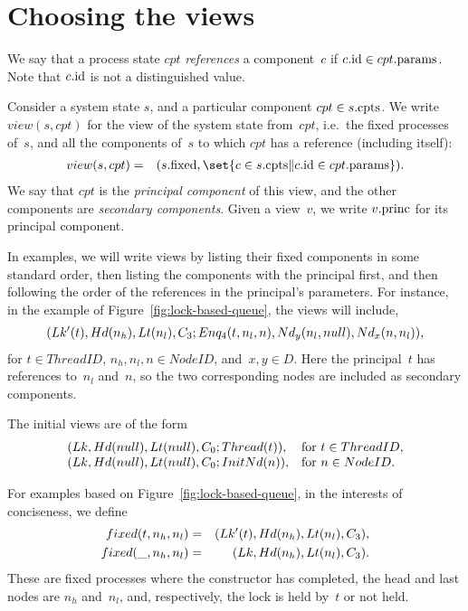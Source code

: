 
\section{Choosing the views}

We say that a process state $cpt$ \emph{references} a component~$c$ if $c.\mathrm{id}
\in cpt.\mathrm{params}$.  Note that $c.\mathrm{id}$ is not a distinguished value.

Consider a system state $s$, and a particular component $cpt \in s.\mathrm{cpts}$.  We
write $view(s, cpt)$ for the view of the system state from~$cpt$, i.e.~the
fixed processes of~$s$, and all the components of~$s$ to which $cpt$ has a
reference (including itself):
%
%
\begin{eqnarray*}
view(s, cpt) & = &
  (s.\fixed, \set{c \in s.\cpts \| c.\id \in cpt.\params}).
\end{eqnarray*}
%
We say that $cpt$ is the \emph{principal component} of this view, and the
other components are \emph{secondary components}.  Given a view~$v$, we write
$v.\mathrm{princ}$ for its principal component. 

In examples, we will write views by listing their fixed components in some
standard order, then listing the components with the principal first, and then
following the order of the references in the principal's parameters.  For
instance, in the example of Figure~\ref{fig:lock-based-queue}, the views will
include,
\[
\begin{align}
(Lk'(t), Hd(n_h), Lt(n_l), C_3; 
  Enq_4(t, n_l, n), Nd_y(n_l, null),Nd_x(n, n_l)),
\end{align}
\]
for $t \in ThreadID$, $n_h, n_l, n \in NodeID$, and~$x, y \in D$.  Here the
principal~$t$ has references to~$n_l$ and~$n$, so the two corresponding nodes
are included as secondary components.

The initial views are of the form
\[
\begin{array}{ll}
(Lk, Hd(null), Lt(null), C_0; Thread(t)), &
   \mbox{for $t \in ThreadID$}, \\
(Lk, Hd(null), Lt(null), C_0; InitNd(n)), & 
   \mbox{for $n \in NodeID$}.
\end{array}
\]

For examples based on Figure~\ref{fig:lock-based-queue}, in the interests of
conciseness, we define
\begin{eqnarray*}
fixed(t, n_h, n_l) & = & (Lk'(t), Hd(n_h), Lt(n_l), C_3), \\
fixed(\_, n_h, n_l) & = & (Lk, Hd(n_h), Lt(n_l), C_3).
\end{eqnarray*}
%
These are fixed processes where the constructor has completed, the head and
last nodes are $n_h$ and~$n_l$, and, respectively, the lock is held by~$t$ or
not held. 

